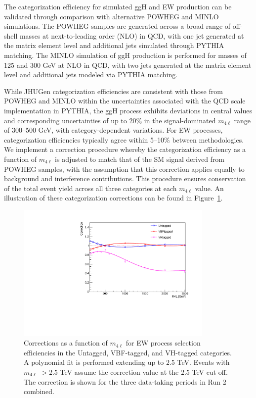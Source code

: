 The categorization efficiency for simulated ggH and EW \Hboson production can be validated through comparison with alternative POWHEG and MINLO simulations. 
The POWHEG samples are generated across a broad range of off-shell \Hboson masses at next-to-leading order (NLO) in QCD, with one jet generated at the matrix element level and additional jets simulated through PYTHIA matching. 
The MINLO simulation of ggH production is performed for \Hboson masses of 125 and $300$ GeV at NLO in QCD, with two jets generated at the matrix element level and additional jets modeled via PYTHIA matching.

While JHUGen categorization efficiencies are consistent with those from POWHEG and MINLO within the uncertainties associated with the QCD scale implementation in PYTHIA,
the ggH process exhibits deviations in central values and corresponding uncertainties of up to 20\% in the signal-dominated $m_{4\ell}$ range of 300--500 GeV, with category-dependent variations. 
For EW processes, categorization efficiencies typically agree within 5--10\% between methodologies. 
We implement a correction procedure whereby the categorization efficiency as a function of $m_{4\ell}$ is adjusted to match that of the SM signal derived from POWHEG samples, with the assumption that this correction applies equally to background and interference contributions. 
This procedure ensures conservation of the total event yield across all three categories at each $m_{4\ell}$ value. An illustration of these categorization corrections can be found in Figure~\ref{fig:ew_catcor}.

\begin{figure}[!hbt]
\centering
\includegraphics[width=0.85\textwidth]{figures/Corrections_allyears.pdf}
\caption {
Corrections as a function of $m_{4\ell}$ for \offshell EW process selection efficiencies in the Untagged, VBF-tagged, and VH-tagged categories. A polynomial fit is performed extending up to $2.5$ TeV. Events with $m_{4\ell}$ $ >  2.5$ TeV assume the correction value at the $2.5$ TeV cut-off. The correction is shown for the three data-taking periods in Run 2 combined.
\label{fig:ew_catcor}}
\end{figure}

